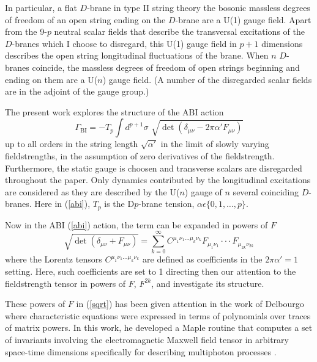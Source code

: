 \documentclass[a4paper,twocolumn]{article}
\begin{document}
In particular, a flat $D$-brane in type II string theory the
bosonic massless degrees of freedom of an open string ending on
the $D$-brane are a U(1) gauge field. Apart from the 9-$p$ neutral
scalar fields that describe the transversal excitations of the
$D$-branes which I choose to disregard, this U(1) gauge field in
$p+1$ dimensions describes the open string longitudinal
fluctuations of the brane.\cite{pol} When $n$ $D$-branes coincide,
the massless degrees of freedom of open strings beginning and
ending on them are a U($n$) gauge field. \cite{wit} (A number of
the disregarded scalar fields are in the adjoint of the gauge
group.)

The present work explores the structure of the ABI action
\cite{sev}
\begin{equation}\label{abi}
    \Gamma_{\mathrm{BI}}
    =-T_p\int d^{p+1}\!\sigma\,\,
    \sqrt{
        \det(
            \delta_{{\mu}{\nu}}-2\pi\alpha'F_{{\mu}{\nu}})}
\end{equation}
up to all orders in the string length $\sqrt{\alpha'}$ in the
limit of slowly varying fieldstrengths, in the assumption of zero
derivatives of the fieldstrength. Furthermore, the static gauge is
choosen and transverse scalars are disregarded throughout the
paper. Only dynamics contributed by the longitudinal excitations
are considered as they are described by the U($n$) gauge of $n$
several coinciding $D$-branes. Here in (\ref{abi}), $T_p$ is the
D$p$-brane tension, $\alpha\epsilon\{0,1,\ldots,p\}$.

Now in the ABI (\ref{abi}) action, the term can be expanded in
powers of $F$ \cite{tsey}
\begin{equation}\label{sqrt}
    \sqrt{
        \det(
            \delta_{{\mu}{\nu}}+F_{{\mu}{\nu}})}
    \!=\!\sum^\infty_{k=0}
    C^{\mu_1\nu_1\ldots\mu_k\nu_k}F_{\mu_1\nu_1}\cdot\cdot\cdot F_{\mu_{2k}\nu_{2k}}
\end{equation}
 where the Lorentz tensors
$C^{\mu_1\nu_1\ldots\mu_k\nu_k}$  are defined as coefficients in
the $2\pi\alpha'=1$ setting. Here, such coefficients are set to 1
directing then our attention to the fieldstrength tensor in powers
of $F$, $F^{2k}$, and investigate its structure.

These powers of $F$ in (\ref{sqrt}) has been given attention in
the work of Delbourgo \cite{delb} where characteristic equations
were expressed in terms of polynomials over traces of matrix
powers. In this work, he developed a Maple routine that computes a
set of invariants involving the electromagnetic Maxwell field
tensor in arbitrary space-time dimensions specifically for
describing multiphoton processes \cite{ritz}.
\end{document}
